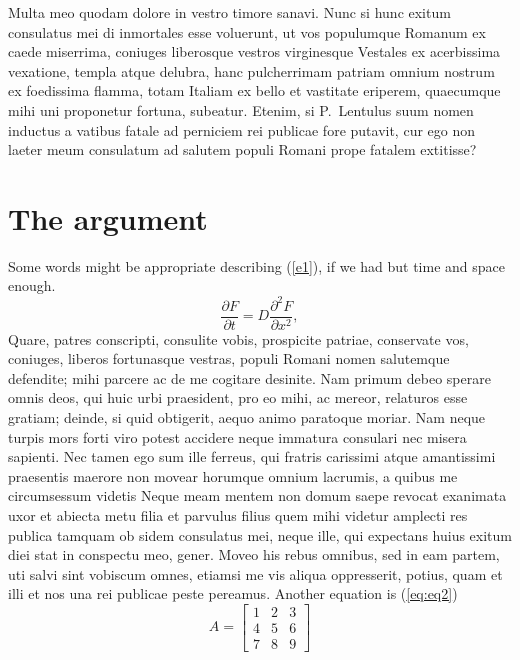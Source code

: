 \documentclass[12pt, a4paper, twoside]{article}
\begin{document}
	Multa meo quodam dolore in vestro timore sanavi. Nunc si hunc exitum
	consulatus mei di inmortales esse voluerunt, ut vos populumque Romanum
	ex caede miserrima, coniuges liberosque vestros virginesque Vestales ex
	acerbissima vexatione, templa atque delubra, hanc pulcherrimam patriam
	omnium nostrum ex foedissima flamma, totam Italiam ex bello et vastitate
	eriperem, quaecumque mihi uni proponetur fortuna, subeatur. Etenim, si
	P.~Lentulus suum nomen inductus a vatibus fatale ad perniciem rei
	publicae fore putavit, cur ego non laeter meum consulatum ad salutem
	populi Romani prope fatalem extitisse?
	
	
	\section{The argument}
	Some words might be appropriate describing (\ref{e1}), if we
	had but time and space enough.
	\begin{equation}
		\frac{\partial F}{\partial
			t}=D\frac{\partial^2 F}{\partial x^2},
		\label{e1}
	\end{equation}
	Quare, patres conscripti, consulite vobis, prospicite patriae,
	conservate vos, coniuges, liberos fortunasque vestras, populi Romani
	nomen salutemque defendite; mihi parcere ac de me cogitare desinite. Nam
	primum debeo sperare omnis deos, qui huic urbi praesident, pro eo mihi,
	ac mereor, relaturos esse gratiam; deinde, si quid obtigerit, aequo
	animo paratoque moriar. Nam neque turpis mors forti viro potest accidere
	neque immatura consulari nec misera sapienti. Nec tamen ego sum ille
	ferreus, qui fratris carissimi atque amantissimi praesentis maerore non
	movear horumque omnium lacrumis, a quibus me circumsessum videtis Neque
	meam mentem non domum saepe revocat exanimata uxor et abiecta metu filia
	et parvulus filius quem mihi videtur amplecti res publica tamquam ob
	sidem consulatus mei, neque ille, qui expectans huius exitum diei stat
	in conspectu meo, gener. Moveo his rebus omnibus, sed in eam partem, uti
	salvi sint vobiscum omnes, etiamsi me vis aliqua oppresserit, potius,
	quam et illi et nos una rei publicae peste pereamus.
	Another equation is (\ref{eq:eq2})
	\begin{equation}
		A=\left[
		\begin{array}{ccc} 
			1 & 2 & 3 \\
			4 & 5 & 6 \\
			7 & 8 & 9
		\end{array} 
		\right]
		\label{eq:eq2}
	\end{equation}
	
\end{document}
